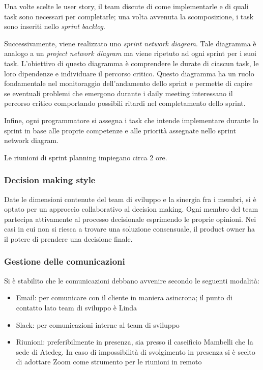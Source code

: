 Una volte scelte le user story, il team discute di come implementarle e di quali task sono necessari per completarle; una volta avvenuta la scomposizione, i task sono inseriti nello \emph{sprint backlog}. 

Successivamente, viene realizzato uno \emph{sprint network diagram}. Tale diagramma è analogo a un \emph{project network diagram} ma viene ripetuto ad ogni sprint per i suoi task. 
L'obiettivo di questo diagramma è comprendere le durate di ciascun task, le loro dipendenze e individuare il percorso critico. 
Questo diagramma ha un ruolo fondamentale nel monitoraggio dell'andamento dello sprint e permette di capire se eventuali problemi che emergono durante i daily meeting interessano il percorso critico comportando possibili ritardi nel completamento dello sprint. 

Infine, ogni programmatore si assegna i task che intende implementare durante lo sprint in base alle proprie competenze e alle priorità assegnate nello sprint network diagram.

Le riunioni di sprint planning impiegano circa 2 ore.

\subsubsection{Decision making style}
Date le dimensioni contenute del team di sviluppo e la sinergia fra i membri, si è optato per un approccio collaborativo al decision making. Ogni membro del team partecipa attivamente al processo decisionale esprimendo le proprie opinioni.
Nei casi in cui non si riesca a trovare una soluzione consensuale, il product owner ha il potere di prendere una decisione finale.

\subsubsection{Gestione delle comunicazioni}
Si è stabilito che le comunicazioni debbano avvenire secondo le seguenti modalità:
\begin{itemize}
  \item Email: per comunicare con il cliente in maniera asincrona; il punto di contatto lato team di sviluppo è Linda
  \item Slack: per comunicazioni interne al team di sviluppo
  \item Riunioni: preferibilmente in presenza, sia presso il caseificio Mambelli che la sede di Atedeg. In caso di impossibilità di svolgimento in presenza si è scelto di adottare Zoom come strumento per le riunioni in remoto
\end{itemize}
